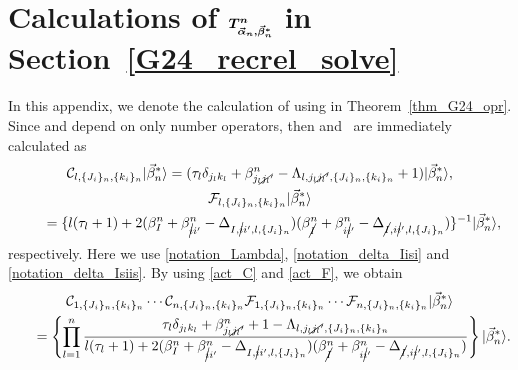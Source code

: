 \documentclass[10pt,a4paper]{amsart}
\numberwithin{equation}{section}
\begin{document}
\section[Calculations of T\string^n in Section 3.3]{Calculations of $\boldsymbol{T^{n}_{\protect\vec{\alpha}_{n},\protect\vec{\beta}_{n}^{\ast}}}$ in Section~\ref{G24_recrel_solve}}
\label{appendix_coeff_T}


In this appendix, we denote the calculation of  using
in
Theorem~\ref{thm_G24_opr}. Since
and
depend on only number operators, then
and~
are immediately calculated as
\begin{gather}
\mathcal{C}_{
l,
\{
J_{i}
\}_{n}
,
\{
k_{i}
\}_{n}
}
|
\vec{\beta}_{n}^{\ast}
\rangle
=
 (
 \tau_{l}
 \delta_{j_{l}k_{l}}
 +
 \beta_{j_{l}\cancel{j_{l}}'}^{n}
 -
 \Lambda_{
 l,
 j_{l}\cancel{j_{l}}',
 \{
 J_{i}
 \}_{n}
 ,
 \{
 k_{i}
 \}_{n}
 }
 +
 1
 )
|
\vec{\beta}_{n}^{\ast}
\rangle,
\label{act_C}
\\
\mathcal{F}_{
l,
\{
J_{i}
\}_{n}
,
\{
k_{i}
\}_{n}
}
|
\vec{\beta}_{n}^{\ast}
\rangle\nonumber\\
\qquad
=
\{
 l
 (
 \tau_{l}
 +
 1
 )
 +
 2
 (
 \beta_{I}^{n}
 +
 \beta_{\cancel{i}i'}^{n}
 -
 \Delta_{
 I,
 \cancel{i}i',
 l,
 \{
 J_{i}
 \}_{n}
 }
 )
 (
 \beta_{\cancel{I}}^{n}
 +
 \beta_{i\cancel{i}'}^{n}
 -
 \Delta_{
 \cancel{I},
 i\cancel{i}',
 l,
 \{
 J_{i}
 \}_{n}
 }
 )
\}^{-1}
|
\vec{\beta}_{n}^{\ast}
\rangle,
\label{act_F}
\end{gather}
respectively.
Here we use \eqref{notation_Lambda}, \eqref{notation_delta_Iisi} and \eqref{notation_delta_Isiis}.
By using \eqref{act_C} and \eqref{act_F}, we obtain
\begin{gather}
 \mathcal{C}_{
 1,
 \{
 J_{i}
 \}_{n}
 ,
 \{
 k_{i}
 \}_{n}
 }
 \cdots
 \mathcal{C}_{
 n,
 \{
 J_{i}
 \}_{n}
 ,
 \{
 k_{i}
 \}_{n}
 }
 \mathcal{F}_{
 1,
 \{
 J_{i}
 \}_{n}
 ,
 \{
 k_{i}
 \}_{n}
 }
 \cdots
 \mathcal{F}_{
 n,
 \{
 J_{i}
 \}_{n}
 ,
 \{
 k_{i}
 \}_{n}
 }
|
 \vec{\beta}_{n}^{\ast}
\rangle
 \nonumber
 \\
\qquad
 =
 \left\{
 \prod_{l=1}^{n}
 \frac{
 \tau_{l}
 \delta_{j_{l}k_{l}}
 +
 \beta_{j_{l}\cancel{j_{l}}'}^{n}
 +
 1
 -
 \Lambda_{
 l,
 j_{l}\cancel{j_{l}}',
 \{
 J_{i}
 \}_{n}
 ,
 \{
 k_{i}
 \}_{n}
 }
 }{
 l
 (
 \tau_{l}+1
 )
 +
 2
 (
 \beta_{I}^{n}
 +
 \beta_{\cancel{i}i'}^{n}
 -
 \Delta_{
 I,
 \cancel{i}i',
 l,
 \{
 J_{i}
 \}_{n}
 }
 )
 (
 \beta_{\cancel{I}}^{n}
 +
 \beta_{i\cancel{i}'}^{n}
 -
 \Delta_{
 \cancel{I},
 i\cancel{i}',
 l,
 \{
 J_{i}
 \}_{n}
 }
 )
 }
 \right\}
|
 \vec{\beta}_{n}^{\ast}
\rangle . \label{act_CandF}
\end{gather}
\end{document}
